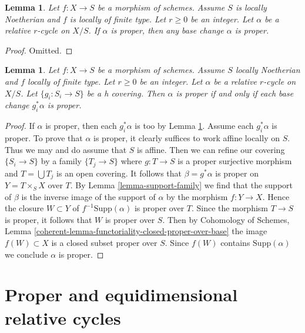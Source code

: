\documentclass{stacks-project}
\theoremstyle{plain}
\newtheorem{lemma}[subsection]{Lemma}
\theoremstyle{definition}
\theoremstyle{remark}
\numberwithin{equation}{subsection}
\begin{document}
\begin{lemma}
\label{lemma-proper-functoriality}
Let $f : X \to S$ be a morphism of schemes. Assume $S$ is locally Noetherian
and $f$ is locally of finite type. Let $r \geq 0$ be an integer. Let
$\alpha$ be a relative $r$-cycle on $X/S$. If $\alpha$ is proper,
then any base change $\alpha$ is proper.
\end{lemma}

\begin{proof}
Omitted.
\end{proof}

\begin{lemma}
\label{lemma-proper-h-descent}
Let $f : X \to S$ be a morphism of schemes. Assume $S$ locally Noetherian
and $f$ locally of finite type. Let $r \geq 0$ be an integer. Let $\alpha$
be a relative $r$-cycle on $X/S$. Let $\{g_i : S_i \to S\}$
be a h covering. Then $\alpha$ is proper
if and only if each base change $g_i^*\alpha$ is proper.
\end{lemma}

\begin{proof}
If $\alpha$ is proper, then each $g_i^*\alpha$ is too by
Lemma \ref{lemma-proper-functoriality}. Assume each $g_i^*\alpha$
is proper. To prove that $\alpha$ is proper, it clearly suffices
to work affine locally on $S$. Thus we may and do assume that $S$
is affine. Then we can refine our covering $\{S_i \to S\}$
by a family $\{T_j \to S\}$ where $g : T \to S$ is a proper surjective
morphism and $T = \bigcup T_j$ is an open covering.
It follows that $\beta = g^*\alpha$ is proper on $Y = T \times_S X$
over $T$. By Lemma \ref{lemma-support-family} we find that the support
of $\beta$ is the inverse image of the support of $\alpha$ by the
morphism $f : Y \to X$. Hence the closure $W \subset Y$
of $f^{-1}\text{Supp}(\alpha)$ is proper over $T$. Since the
morphism $T \to S$ is proper, it follows that $W$ is proper over $S$.
Then by Cohomology of Schemes, Lemma
\ref{coherent-lemma-functoriality-closed-proper-over-base}
the image $f(W) \subset X$ is a closed subset proper over $S$.
Since $f(W)$ contains $\text{Supp}(\alpha)$ we conclude $\alpha$
is proper.
\end{proof}



\section{Proper and equidimensional relative cycles}
\label{section-proper-equidimensional}
\end{document}
